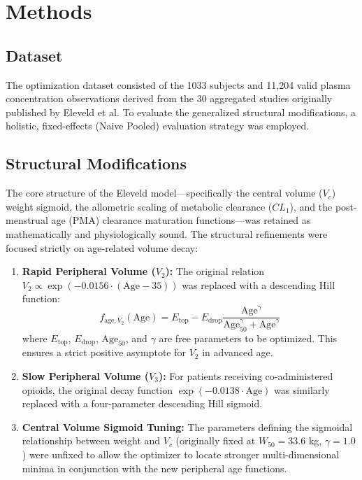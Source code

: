 \documentclass[12pt,a4paper]{article}
\begin{document}
\section{Methods}

\subsection{Dataset}
The optimization dataset consisted of the 1033 subjects and 11,204 valid plasma concentration observations derived from the 30 aggregated studies originally published by Eleveld et al. To evaluate the generalized structural modifications, a holistic, fixed-effects (Naive Pooled) evaluation strategy was employed.

\subsection{Structural Modifications}
The core structure of the Eleveld model—specifically the central volume ($V_c$) weight sigmoid, the allometric scaling of metabolic clearance ($CL_1$), and the post-menstrual age (PMA) clearance maturation functions—was retained as mathematically and physiologically sound. The structural refinements were focused strictly on age-related volume decay:

\begin{enumerate}
    \item \textbf{Rapid Peripheral Volume ($V_2$):} The original relation $V_2 \propto \exp(-0.0156 \cdot (\text{Age} - 35))$ was replaced with a descending Hill function:
    \begin{equation}
        f_{\text{age}, V_2}(\text{Age}) = E_{\text{top}} - E_{\text{drop}} \frac{\text{Age}^{\gamma}}{\text{Age}_{50}^{\gamma} + \text{Age}^{\gamma}}
    \end{equation}
    where $E_{\text{top}}$, $E_{\text{drop}}$, $\text{Age}_{50}$, and $\gamma$ are free parameters to be optimized. This ensures a strict positive asymptote for $V_2$ in advanced age.
    
    \item \textbf{Slow Peripheral Volume ($V_3$):} For patients receiving co-administered opioids, the original decay function $\exp(-0.0138 \cdot \text{Age})$ was similarly replaced with a four-parameter descending Hill sigmoid.
    
    \item \textbf{Central Volume Sigmoid Tuning:} The parameters defining the sigmoidal relationship between weight and $V_c$ (originally fixed at $W_{50} = 33.6$ kg, $\gamma = 1.0$) were unfixed to allow the optimizer to locate stronger multi-dimensional minima in conjunction with the new peripheral age functions.
\end{enumerate}
\end{document}
